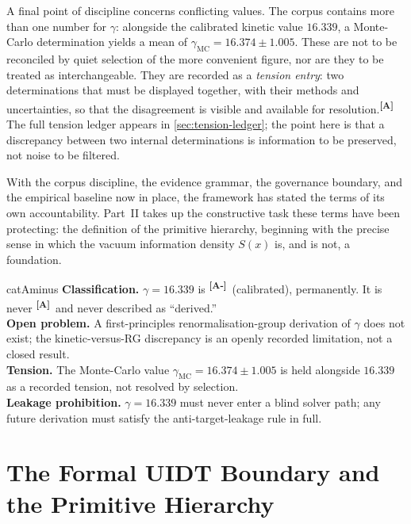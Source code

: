 \documentclass[12pt,a4paper,twoside]{article}
\theoremstyle{plain}
\theoremstyle{definition}
\theoremstyle{remark}
\newcommand{\catmark}[1]{\textsuperscript{\textsf{\textbf{[#1]}}}}
\newcommand{\Sx}{S(x)}
\newcommand{\GammaGeom}{16.339} %
\newcommand{\GammaMC}{16.374 \pm 1.005} %
\begin{document}
A final point of discipline concerns conflicting values. The corpus contains more than one number for $\gamma$: alongside the calibrated kinetic value $16.339$, a Monte-Carlo determination yields a mean of $\gamma_{\mathrm{MC}} = \GammaMC$. These are not to be reconciled by quiet selection of the more convenient figure, nor are they to be treated as interchangeable. They are recorded as a \emph{tension entry}: two determinations that must be displayed together, with their methods and uncertainties, so that the disagreement is visible and available for resolution.\catmark{A} The full tension ledger appears in \cref{sec:tension-ledger}; the point here is that a discrepancy between two internal determinations is information to be preserved, not noise to be filtered.

\noindent With the corpus discipline, the evidence grammar, the governance boundary, and the empirical baseline now in place, the framework has stated the terms of its own accountability. Part~II takes up the constructive task these terms have been protecting: the definition of the primitive hierarchy, beginning with the precise sense in which the vacuum information density $\Sx$ is, and is not, a foundation.

\begin{evidencebox}{catAminus}
\textbf{Classification.} $\gamma = \GammaGeom$ is \catmark{A-}\ (calibrated), permanently. It is never \catmark{A}\ and never described as
``derived.''\\[0.3em]
\textbf{Open problem.} A first-principles renormalisation-group derivation of $\gamma$ does not exist; the kinetic-versus-RG discrepancy is an openly recorded
limitation, not a closed result.\\[0.3em]
\textbf{Tension.} The Monte-Carlo value $\gamma_{\mathrm{MC}} = \GammaMC$ is held alongside $16.339$ as a recorded tension, not resolved by
selection.\\[0.3em]
\textbf{Leakage prohibition.} $\gamma = 16.339$ must never enter a blind solver path; any future derivation must satisfy the anti-target-leakage rule in full.
\end{evidencebox}
\newpage
\part{The Formal UIDT Boundary and the Primitive Hierarchy}
\label{part:primitive-hierarchy}
\end{document}
